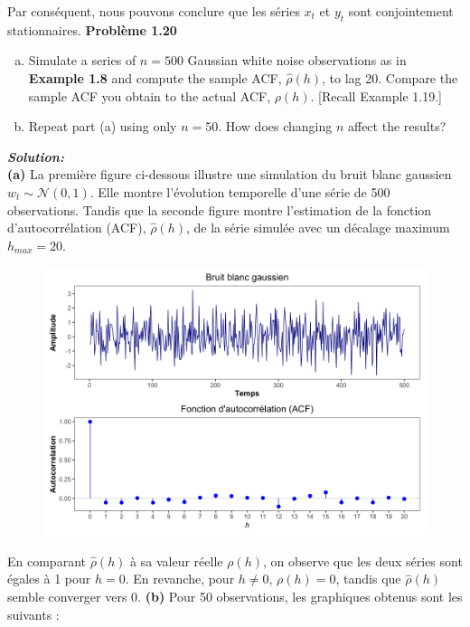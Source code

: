 \documentclass{homework}
\begin{document}
Par conséquent, nous pouvons conclure que les séries $x_t$ et $y_t$ sont conjointement stationnaires.
\newpage
\textbf{\Large{Problème 1.20}}

\begin{enumerate}[(a)]
    \item Simulate a series of $n = 500$ Gaussian white noise observations as in \textbf{Example 1.8} and compute the sample ACF, $\hat{\rho}(h)$, to lag 20. Compare the sample ACF you obtain to the actual ACF, $\rho(h)$. [Recall Example 1.19.]
    \item Repeat part (a) using only $n = 50$. How does changing $n$ affect the results?\\
\end{enumerate}

\textit{\textbf{Solution:}}\\
\textbf{(a)} La première figure ci-dessous illustre une simulation du bruit blanc gaussien $ w_t \sim \mathcal{N}(0,1)$. Elle montre l'évolution temporelle d'une série de 500 observations. Tandis que la seconde figure montre l'estimation de la fonction d'autocorrélation (ACF), $\hat{\rho}(h)$, de la série simulée avec un décalage maximum $h_{max}=20$.  
\begin{figure}[h]
    \centering
    \includegraphics[width=1\linewidth]{figure1.20.png}
\end{figure}

En comparant $\hat{\rho}(h)$ à sa valeur réelle $\rho(h)$, on observe que les deux séries sont égales à 1 pour $h = 0$. En revanche, pour $h \neq 0$, $\rho(h) = 0$, tandis que $\hat{\rho}(h)$ semble converger vers 0.
\newpage
\textbf{(b)} Pour 50 observations, les graphiques obtenus sont les suivants :
\end{document}
